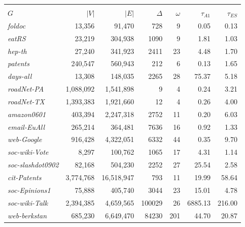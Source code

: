 \begin{table}[!hbt]
\begin{tabular}{lrrrr|rr}
	&		&		&		&		&		&		\\
$G$	&	$\left|V\right|$	&	$\left|E\right|$	&	$\Delta$	&	$\omega$	&	$\tau_{A1}$	&	$\tau_{ES}$ \cite{sea}  	\\ \hline \hline
{\it foldoc}	&	13,356	&	91,470	&	728	&	9	&	0.05	&	0.13	\\
{\it eatRS}	&	23,219	&	304,938	&	1090	&	9	&	1.81	&	1.03	\\
{\it hep-th}	&	27,240	&	341,923	&	2411	&	23	&	4.48	&	1.70	\\
{\it patents}	&	240,547	&	560,943	&	212	&	6	&	0.13	&	1.65	\\
{\it days-all}	&	13,308	&	148,035	&	2265	&	28	&	75.37	&	5.18	\\
{\it roadNet-PA}	&	1,088,092	&	1,541,898	&	9	&	4	&	0.24	&	3.21	\\
{\it roadNet-TX}	&	1,393,383	&	1,921,660	&	12	&	4	&	0.26	&	4.00	\\
{\it amazon0601}	&	403,394	&	2,247,318	&	2752	&	11	&	0.20	&	6.03	\\
{\it email-EuAll}	&	265,214	&	364,481	&	7636	&	16	&	0.92	&	1.33	\\
{\it web-Google}	&	916,428	&	4,322,051	&	6332	&	44	&	0.35	&	9.70	\\
{\it soc-wiki-Vote}	&	8,297	&	100,762	&	1065	&	17	&	4.31	&	1.14	\\
{\it soc-slashdot0902}	&	82,168	&	504,230	&	2252	&	27	&	25.54	&	2.58	\\
{\it cit-Patents}	&	3,774,768	&	16,518,947	&	793	&	11	&	19.99	&	58.64	\\
{\it soc-Epinions1}	&	75,888	&	405,740	&	3044	&	23	&	15.01	&	4.78	\\
{\it soc-wiki-Talk}	&	2,394,385	&	4,659,565	&	100029	&	26	&	6885.13	&	216.00	\\
{\it web-berkstan}	&	685,230	&	6,649,470	&	84230	&	201	&	44.70	&	20.87	\\
\bottomrule\bottomrule
\end{tabular}
\end{table}
